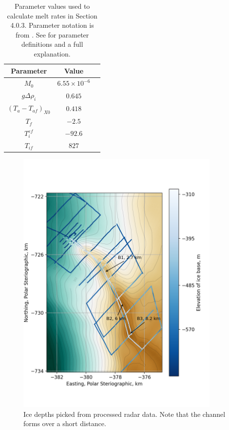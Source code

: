 \label{ch:appendix}


\begin{table}[ht!]
\begin{tabular}{|c|c|c|} 
    \hline
    Parameter &  Value\\
    \hline
     $M_0 $ & $ 6.55 \times 10^{-6}$\\
      $g \Delta \rho_i $ & $ 0.645$\\
      $(T_a - T_{af})_{X0} $ & $ 0.418$\\
      $T_f $ & $ -2.5$\\
      $ T^{ef}_i $ & $ -92.6$\\
      $T_{if} $ & $ 827$ \\
      \hline
\end{tabular}
\caption{Parameter values used to calculate melt rates in Section 4.0.3. Parameter notation is from \cite{jenkins2011convection}. See \cite{jenkins2011convection} for parameter definitions and a full explanation.}
\label{jenkins_params}
\end{table}


\begin{figure}[!ht]
\centering
\includegraphics[width=0.9\textwidth]{chapters/2/radarlines_surfcolour.png}
\caption[]{Ice depths picked from processed radar data. Note that the channel forms over a short distance.}
\label{fig:radarlines_surfcoloure}
\end{figure}



